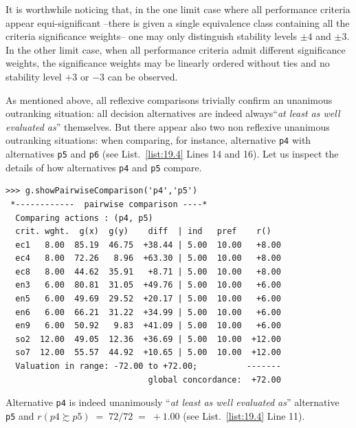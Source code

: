 It is worthwhile noticing that, in the one limit case where all performance criteria appear equi-significant --there is given a single equivalence class containing all the criteria significance weights-- one may only distinguish stability levels $\pm 4$ and $\pm 3$. In the other limit case, when all performance criteria admit different significance weights, the significance weights may be linearly ordered without ties and no stability level $+3$ or $-3$ can be observed.

As mentioned above, all reflexive comparisons trivially confirm an unanimous outranking situation: all decision alternatives are indeed always``\emph{at least as well evaluated as}'' themselves. But there appear also two non reflexive unanimous outranking situations: when comparing, for instance, alternative \texttt{p4} with alternatives \texttt{p5} and \texttt{p6} (see List.~\vref{list:19.4} Lines 14 and 16). Let us inspect the details of how alternatives \texttt{p4} and \texttt{p5} compare.
\begin{lstlisting}
>>> g.showPairwiseComparison('p4','p5')
 *------------  pairwise comparison ----*
  Comparing actions : (p4, p5)
  crit. wght.  g(x)  g(y)    diff  | ind   pref    r()
  ec1   8.00  85.19  46.75  +38.44 | 5.00  10.00   +8.00
  ec4   8.00  72.26   8.96  +63.30 | 5.00  10.00   +8.00
  ec8   8.00  44.62  35.91   +8.71 | 5.00  10.00   +8.00
  en3   6.00  80.81  31.05  +49.76 | 5.00  10.00   +6.00
  en5   6.00  49.69  29.52  +20.17 | 5.00  10.00   +6.00
  en6   6.00  66.21  31.22  +34.99 | 5.00  10.00   +6.00
  en9   6.00  50.92   9.83  +41.09 | 5.00  10.00   +6.00
  so2  12.00  49.05  12.36  +36.69 | 5.00  10.00  +12.00
  so7  12.00  55.57  44.92  +10.65 | 5.00  10.00  +12.00
  Valuation in range: -72.00 to +72.00;          -------
                             global concordance:  +72.00
\end{lstlisting}
Alternative \texttt{p4} is indeed  unanimously ``\emph{at least as well evaluated as}'' alternative \texttt{p5} and $r(p4 \succsim p5)\; =\; 72/72\; =\; +1.00$ (see List.~\vref{list:19.4} Line 11).

